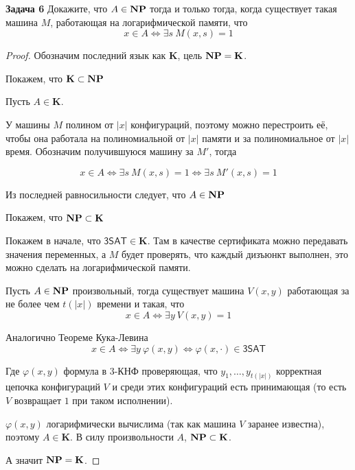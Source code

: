 \textbf{Задача 6} Докажите, что $A\in\textbf{NP}$ тогда и только тогда, когда существует такая машина $M$, работающая на логарифмической памяти, что 
\[x\in A\iff \exists s\ M(x,s)=1\]

\begin{proof}

Обозначим последний язык как $\textbf{K}$, цель $\textbf{NP}=\textbf{K}$.

Покажем, что $\textbf{K}\subset\textbf{NP}$

Пусть $A\in\textbf{K}$.

У машины $M$ полином от $|x|$ конфигураций, поэтому можно перестроить её, чтобы она работала на полиномиальной от $|x|$ памяти и за полиномиальное от $|x|$ время. Обозначим получившуюся машину за $M'$, тогда

\[x\in A\iff \exists s\ M(x,s)=1\iff \exists s\ M'(x,s)=1\]

Из последней равносильности следует, что $A\in\textbf{NP}$

Покажем, что $\textbf{NP}\subset\textbf{K}$

Покажем в начале, что $\mathsf{3SAT}\in\textbf{K}$. Там в качестве сертификата можно передавать значения переменных, а $M$ будет проверять, что каждый дизъюнкт выполнен, это можно сделать на логарифмической памяти.

Пусть $A\in\textbf{NP}$ произвольный, тогда существует машина $V(x,y)$ работающая за не более чем $t(|x|)$ времени и такая, что
\[x\in A\iff\exists y\ V(x,y)=1\]

Аналогично Теореме Кука-Левина
\[x\in A \iff \exists y\ \varphi(x, y)  \iff   \varphi(x, \cdot) \in \mathsf{3SAT}\]

Где $\varphi(x, y)$ формула в $3$-КНФ проверяющая, что $y_1, \ldots, y_{t(|x|)}$ корректная цепочка конфигураций $V$ и среди этих конфигураций есть принимающая (то есть $V$ возвращает $1$ при таком исполнении). 

$\varphi(x, y)$ логарифмически вычислима (так как машина $V$ заранее известна), поэтому $A\in\textbf{K}$. В силу произвольности $A$, $\textbf{NP}\subset\textbf{K}$.

А значит $\textbf{NP}=\textbf{K}$.
\end{proof}